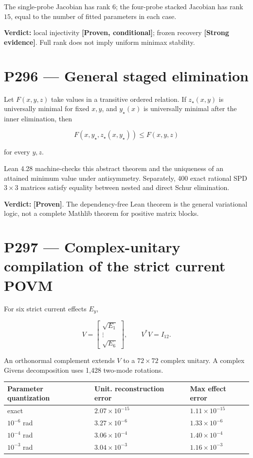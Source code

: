 \documentclass[11pt,a4paper,openany]{report}
\newcommand{\statusProven}{\textcolor{fingreen}{[Proven]}}
\newcommand{\statusStrong}{\textcolor{finblue}{[Strong evidence]}}
\begin{document}
The single-probe Jacobian has rank \(6\); the four-probe stacked Jacobian has rank \(15\), equal to the number of fitted parameters in each case.

\textbf{Verdict:} local injectivity \textbf{[Proven, conditional]}; frozen recovery \textbf{\statusStrong{}}. Full rank does not imply uniform minimax stability.

\section{P296 --- General staged elimination}

Let \(F(x,y,z)\) take values in a transitive ordered relation. If \(z_\star(x,y)\) is universally minimal for fixed \(x,y\), and \(y_\star(x)\) is universally minimal after the inner elimination, then

\[
F(x,y_\star,z_\star(x,y_\star))
\le
F(x,y,z)
\]

for every \(y,z\).

Lean 4.28 machine-checks this abstract theorem and the uniqueness of an attained minimum value under antisymmetry. Separately, 400 exact rational SPD \(3\times3\) matrices satisfy equality between nested and direct Schur elimination.

\textbf{Verdict:} \textbf{\statusProven{}}. The dependency-free Lean theorem is the general variational logic, not a complete Mathlib theorem for positive matrix blocks.

\section{P297 --- Complex-unitary compilation of the strict current POVM}

For six strict current effects \(E_y\),

\[
V
=
\begin{bmatrix}
\sqrt{E_1}\\
\vdots\\
\sqrt{E_6}
\end{bmatrix},
\qquad
V^\ast V=I_{12}.
\]

An orthonormal complement extends \(V\) to a \(72\times72\) complex unitary. A complex Givens decomposition uses 1,428 two-mode rotations.

\begin{center}
\begingroup\small
\setlength{\tabcolsep}{2.5pt}
\renewcommand{\arraystretch}{1.16}
\begin{longtable}{@{}p{}p{}p{}@{}}
\toprule
\textbf{Parameter quantization} & \textbf{Unit. reconstruction error} & \textbf{Max effect error} \\
\midrule
\endhead
exact & \(2.07\times10^{-15}\) & \(1.11\times10^{-15}\) \\
\(10^{-6}\) rad & \(3.27\times10^{-6}\) & \(1.33\times10^{-6}\) \\
\(10^{-4}\) rad & \(3.06\times10^{-4}\) & \(1.40\times10^{-4}\) \\
\(10^{-3}\) rad & \(3.04\times10^{-3}\) & \(1.16\times10^{-3}\) \\
\bottomrule
\end{longtable}
\endgroup
\end{center}
\end{document}
